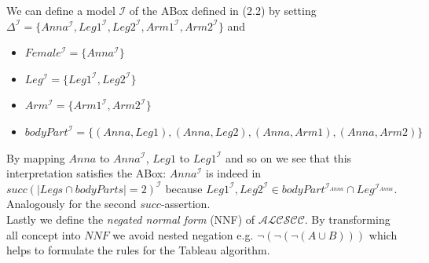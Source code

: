 \documentclass{book}
\theoremstyle{break}
\theoremstyle{definition}
\begin{document}
We can define a model $\mathcal{I}$ of the ABox defined in (2.2) by setting $\Delta^\mathcal{I}=\{Anna^\mathcal{I}, Leg1^\mathcal{I}, Leg2^\mathcal{I}, Arm1^\mathcal{I}, Arm2^\mathcal{I}\}$ and 
\begin{itemize}
\item $Female^\mathcal{I}=\{Anna^\mathcal{I}\}$
\item $Leg^\mathcal{I}=\{Leg1^\mathcal{I}, Leg2^\mathcal{I}\}$
\item $Arm^\mathcal{I}=\{Arm1^\mathcal{I}, Arm2^\mathcal{I}\}$
\item $bodyPart^\mathcal{I}=\{(Anna,Leg1),(Anna,Leg2), (Anna,Arm1), (Anna,Arm2)\}$
\end{itemize}
By mapping $Anna$ to $Anna^\mathcal{I}$, $Leg1$ to $Leg1^\mathcal{I}$ and so on we see that this interpretation satisfies the ABox: $Anna^\mathcal{I}$ is indeed in $succ(|Legs\cap bodyParts|=2)^\mathcal{I}$ because $Leg1^\mathcal{I},Leg2^\mathcal{I}\in bodyPart^{\mathcal{I}_{Anna}}\cap Leg^{\mathcal{I}_{Anna}}$. Analogously for the second $succ$-assertion.\\
Lastly we define the \textit{negated normal form} (NNF) of $\mathcal{ALCSCC}$. By transforming all concept into $NNF$ we avoid nested negation e.g. $\neg(\neg(\neg(A\cup B)))$ which helps to formulate the rules for the Tableau algorithm.
\end{document}
